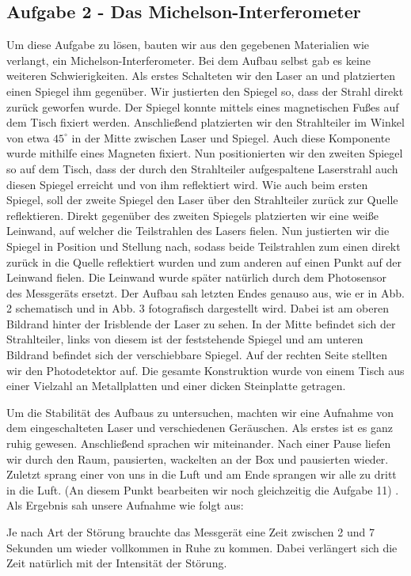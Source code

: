 \subsection*{Aufgabe 2 - Das Michelson-Interferometer}
Um diese Aufgabe zu lösen, bauten wir aus den gegebenen Materialien wie verlangt, ein Michelson-Interferometer. Bei dem Aufbau selbst gab es keine weiteren Schwierigkeiten. 
Als erstes Schalteten wir den Laser an und platzierten einen Spiegel ihm gegenüber. Wir justierten den Spiegel so, dass der Strahl direkt zurück geworfen wurde. Der Spiegel konnte mittels eines magnetischen Fußes auf dem Tisch fixiert werden. Anschließend platzierten wir den Strahlteiler im Winkel von etwa $45^{\circ}$ in der Mitte zwischen Laser und Spiegel. Auch diese Komponente wurde mithilfe eines Magneten fixiert.
Nun positionierten wir den zweiten Spiegel so auf dem Tisch, dass der durch den Strahlteiler aufgespaltene Laserstrahl auch diesen Spiegel erreicht und von ihm reflektiert wird. Wie auch beim ersten Spiegel, soll der zweite Spiegel den Laser über den Strahlteiler zurück zur Quelle reflektieren.
Direkt gegenüber des zweiten Spiegels platzierten wir eine weiße Leinwand, auf welcher die Teilstrahlen des Lasers fielen. Nun justierten wir die Spiegel in Position und Stellung nach, sodass beide Teilstrahlen zum einen direkt zurück in die Quelle reflektiert wurden und zum anderen auf einen Punkt auf der Leinwand fielen. 
Die Leinwand wurde später natürlich durch dem Photosensor des Messgeräts ersetzt.
Der Aufbau sah letzten Endes genauso aus, wie er in Abb. 2 schematisch und in Abb. 3 fotografisch dargestellt wird. Dabei ist am oberen Bildrand hinter der Irisblende der Laser zu sehen. In der Mitte befindet sich der Strahlteiler, links von diesem ist der feststehende Spiegel und am unteren Bildrand befindet sich der verschiebbare Spiegel. Auf der rechten Seite stellten wir den Photodetektor auf. Die gesamte Konstruktion wurde von einem Tisch aus einer Vielzahl an Metallplatten und einer dicken Steinplatte getragen.


Um die Stabilität des Aufbaus zu untersuchen, machten wir eine Aufnahme von dem eingeschalteten Laser und verschiedenen Geräuschen. Als erstes ist es ganz ruhig gewesen. Anschließend sprachen wir miteinander. Nach einer Pause liefen wir durch den Raum, pausierten, wackelten an der Box und pausierten wieder. Zuletzt sprang einer von uns in die Luft und am Ende sprangen wir alle zu dritt in die Luft. (An diesem Punkt bearbeiten wir noch gleichzeitig die Aufgabe 11) .
Als Ergebnis sah unsere Aufnahme wie folgt aus:


Je nach Art der Störung brauchte das Messgerät eine Zeit zwischen 2 und 7 Sekunden um wieder vollkommen in Ruhe zu kommen. Dabei verlängert sich die Zeit natürlich mit der Intensität der Störung.